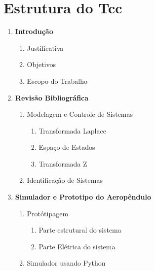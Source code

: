 \documentclass[12pt,oneside,a4paper,brazil]{abntex2}
\begin{document}
	\renewcommand{\labelenumii}{\arabic{enumi}.\arabic{enumii}}
	\renewcommand{\labelenumiii}{\arabic{enumi}.\arabic{enumii}.\arabic{enumiii}}
	\renewcommand{\labelenumiv}{\arabic{enumi}.\arabic{enumii}.\arabic{enumiii}.\arabic{enumiv}}
	\chapter*{Estrutura do Tcc}
	\color{normal}
	
	\begin{enumerate}
		\item \textbf{Introdução}
		\begin{enumerate}
			\item Justificativa
			\item Objetivos
			\item Escopo do Trabalho
		\end{enumerate}


		\item \textbf{Revisão Bibliográfica}
		\begin{enumerate}
			\item Modelagem e Controle de Sistemas
			\begin{enumerate}
				\item Transformada Laplace
				\item Espaço de Estados
				\item Transformada Z
			\end{enumerate}
			\item Identificação de Sistemas
		\end{enumerate}
	
	
		\item \textbf{Simulador e Prototipo do Aeropêndulo}
		\begin{enumerate}
			\item Protótipagem
			\begin{enumerate}
				\item Parte estrutural do sistema
				\item Parte Elétrica do sistema
			\end{enumerate}
			\item Simulador usando Python
		\end{enumerate}
		

\end{enumerate}
\end{document}
